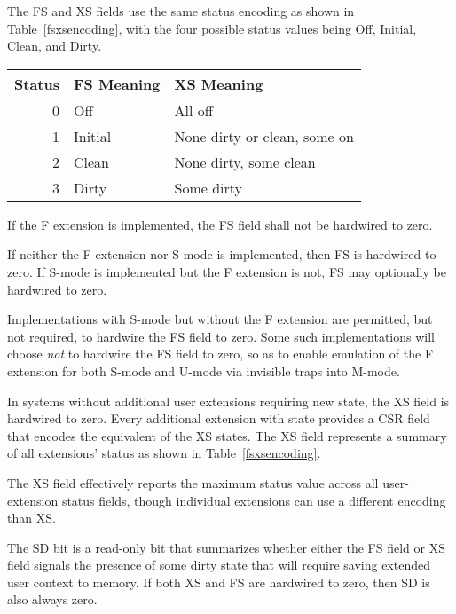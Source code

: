 The FS and XS fields use the same status encoding as shown in
Table~\ref{fsxsencoding}, with the four possible status values being
Off, Initial, Clean, and Dirty.

\begin{table*}[h!]
\begin{center}
\begin{tabular}{|r|l|l|}
\hline
Status  & FS Meaning & XS Meaning\\
\hline
0 & Off     &  All off \\
1 & Initial &  None dirty or clean, some on\\
2 & Clean   &  None dirty, some clean \\
3 & Dirty   &  Some dirty \\
\hline
\end{tabular}
\end{center}
\caption{Encoding of FS[1:0] and XS[1:0] status fields.}
\label{fsxsencoding}
\end{table*}

If the F extension is implemented, the FS field shall not be
hardwired to zero.

If neither the F extension nor S-mode is implemented, then FS is
hardwired to zero.
If S-mode is implemented but the F extension is not, FS may optionally
be hardwired to zero.

\begin{commentary}
Implementations with S-mode but without the F extension are
permitted, but not required, to hardwire the FS field to zero.
Some such implementations will choose {\em not} to hardwire the FS
field to zero, so as to enable emulation of the F extension for
both S-mode and U-mode via invisible traps into M-mode.
\end{commentary}

In systems without additional user extensions requiring new state, the
XS field is hardwired to zero.  Every additional extension with state
provides a CSR field that encodes the equivalent of the XS states.
The XS field represents a summary of all
extensions' status as shown in Table~\ref{fsxsencoding}.

\begin{commentary}
The XS field effectively reports the maximum status value across all
user-extension status fields, though individual extensions can use a
different encoding than XS.
\end{commentary}

The SD bit is a read-only bit that summarizes whether either the FS
field or XS field signals the presence of some dirty state that will
require saving extended user context to memory.  If both XS and FS are
hardwired to zero, then SD is also always zero.

